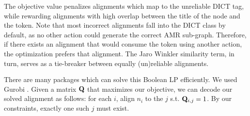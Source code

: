 The objective value penalizes alignments which map to the unreliable DICT tag,
  while rewarding alignments with high overlap between the title of the node and
  the token.
Note that most incorrect alignments fall into the DICT class by default, as no other
  action could generate the correct AMR sub-graph.
Therefore, if there exists an alignment that would consume the token using another
  action, the optimization prefers that alignment.
The Jaro Winkler similarity term, in turn, serves as a tie-breaker between equally
  (un)reliable alignments.

%
%
%
%
%

There are many packages which can solve this Boolean LP efficiently.
We used Gurobi \cite{gurobi}.
Given a matrix $\mathbf{Q}$ that maximizes our objective, we can decode our solved alignment 
  as follows: for each $i$, align $n_i$ to the $j$ s.t. $\mathbf{Q}_{i,j} = 1$. 
By our constraints, exactly one such $j$ must exist.
